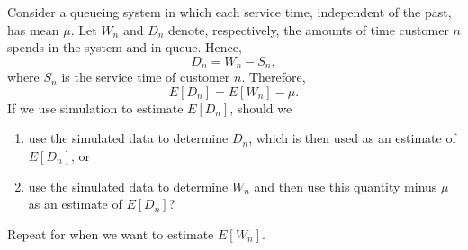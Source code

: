 
\setcounter{exercise}{30}
\begin{exercise}
\label{ex:simulation-31}
Consider a queueing system in which each service time, independent of the past, has mean $\mu$. Let $W_n$ and $D_n$ denote, respectively, the amounts of time customer $n$ spends in the system and in queue. Hence,
\[
D_n=W_n-S_n,
\]
where $S_n$ is the service time of customer $n$. Therefore,
\[
E[D_n]=E[W_n]-\mu.
\]
If we use simulation to estimate $E[D_n]$, should we
\begin{enumerate}
\item use the simulated data to determine $D_n$, which is then used as an estimate of $E[D_n]$, or
\item use the simulated data to determine $W_n$ and then use this quantity minus $\mu$ as an estimate of $E[D_n]$?
\end{enumerate}
Repeat for when we want to estimate $E[W_n]$.
\end{exercise}

